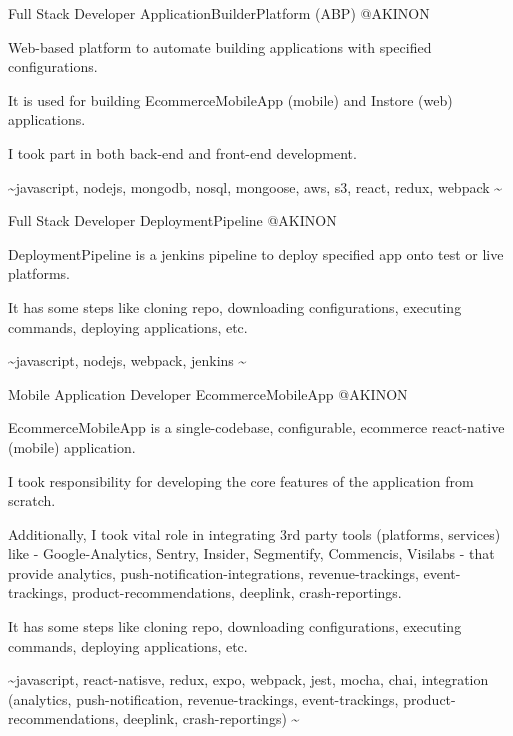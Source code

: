 \begin{cventries}
  \cventry
    {Full Stack Developer} %
    {ApplicationBuilderPlatform (ABP)} %
    {@AKINON} %
    {}
    {
      \begin{cvitems} %
        \item {Web-based platform to automate building applications with specified configurations.}
        \item {It is used for building EcommerceMobileApp (mobile) and Instore (web) applications.}
        \item {I took part in both back-end and front-end development.}
        \item {\textasciitilde javascript, nodejs, mongodb, nosql, mongoose, aws, s3, react, redux, webpack \textasciitilde}
      \end{cvitems}
    }

  \cventry
    {Full Stack Developer} %
    {DeploymentPipeline} %
    {@AKINON} %
    {}
    {
      \begin{cvitems} %
        \item {DeploymentPipeline is a jenkins pipeline to deploy specified app onto test or live platforms.}
        \item {It has some steps like cloning repo, downloading configurations, executing commands, deploying applications, etc.}
        \item {\textasciitilde javascript, nodejs, webpack, jenkins \textasciitilde}
      \end{cvitems}
    }

  \cventry
    {Mobile Application Developer} %
    {EcommerceMobileApp} %
    {@AKINON} %
    {}
    {
      \begin{cvitems} %
        \item {EcommerceMobileApp is a single-codebase, configurable, ecommerce react-native (mobile) application.}
        \item {I took responsibility for developing the core features of the application from scratch.}
        \item {Additionally, I took vital role in integrating 3rd party tools (platforms, services) like - Google-Analytics, Sentry, Insider, Segmentify, Commencis, Visilabs - that provide analytics, push-notification-integrations, revenue-trackings, event-trackings, product-recommendations, deeplink, crash-reportings.}
        \item {It has some steps like cloning repo, downloading configurations, executing commands, deploying applications, etc.}
        \item {\textasciitilde javascript, react-natisve, redux, expo, webpack, jest, mocha, chai, integration (analytics, push-notification, revenue-trackings, event-trackings, product-recommendations, deeplink, crash-reportings) \textasciitilde}
      \end{cvitems}
    }


\end{cventries}
